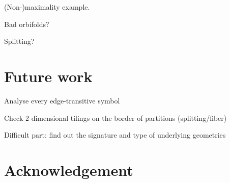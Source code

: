 \documentclass[12pt,a4paper]{article}
\theoremstyle{plain}%
\theoremstyle{definition}
\theoremstyle{remark}
\begin{document}




(Non-)maximality example.

Bad orbifolds?

Splitting?

\section{Future work}
Analyse every edge-transitive symbol

Check 2 dimensional tilings on the border of partitions (splitting/fiber)

Difficult part: find out the signature and type of underlying geometries

\section{Acknowledgement}


\nocite{DHM93,D87,Du88,H93,LM90,Ma67,M94,T82,VS93,F94,M11,DDH98,K11}


\end{document}
